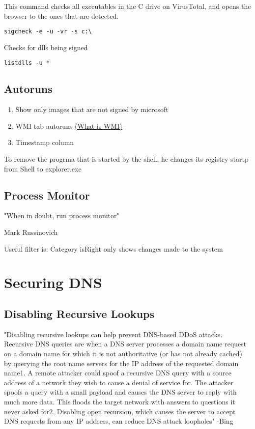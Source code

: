 \documentclass{article}
\begin{document}
This command checks all executables in the C drive on VirusTotal,
 and opens the browser to the ones that are detected.
\begin{lstlisting}[breaklines=true, columns=fullflexible]
        sigcheck -e -u -vr -s c:\       
\end{lstlisting}

Checks for dlls being signed
\begin{lstlisting}[breaklines=true, columns=fullflexible]
        listdlls -u *       
\end{lstlisting}

\subsection{Autoruns}

\begin{enumerate}
        \item Show only images that are not signed by microsoft
        \item WMI tab autoruns \href{https://medium.com/threatpunter/detecting-removing-wmi-persistence-60ccbb7dff96}{(What is WMI)}
        \item Timestamp column
\end{enumerate}

To remove the progrma that is started by the shell, he changes its registry startp from 
Shell to explorer.exe

\subsection{Process Monitor}
\epigraph{"When in doubt, run process monitor"}{Mark Russinovich}

Useful filter is:
Category isRight only shows changes made to the system


\section{Securing DNS}

\subsection{Disabling Recursive Lookups}
"Disabling recursive lookups can help prevent DNS-based DDoS attacks. 
Recursive DNS queries are when a DNS server processes a domain name 
request on a domain name for which it is not authoritative 
(or has not already cached) by querying the root name servers for 
the IP address of the requested domain name1. A remote attacker could 
spoof a recursive DNS query with a source address of a network they 
wish to cause a denial of service for. The attacker spoofs a query 
with a small payload and causes the DNS server to reply with much 
more data. This floods the target network with answers to questions 
it never asked for2. Disabling open recursion, which causes the server 
to accept DNS 
requests from any IP address, can reduce DNS attack loopholes" -Bing
\end{document}
